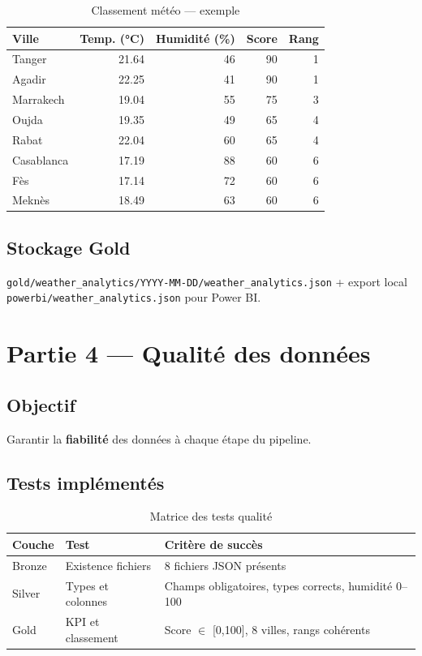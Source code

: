 \documentclass[12pt,a4paper]{report}
\begin{document}
\begin{table}[H]
\centering
\caption{Classement météo — exemple}
\begin{tabular}{@{}lrrrr@{}}
\toprule
\textbf{Ville} & \textbf{Temp. (°C)} & \textbf{Humidité (\%)} & \textbf{Score} & \textbf{Rang} \\
\midrule
Tanger    & 21.64 & 46 & 90 & 1 \\
Agadir    & 22.25 & 41 & 90 & 1 \\
Marrakech & 19.04 & 55 & 75 & 3 \\
Oujda     & 19.35 & 49 & 65 & 4 \\
Rabat     & 22.04 & 60 & 65 & 4 \\
Casablanca& 17.19 & 88 & 60 & 6 \\
Fès       & 17.14 & 72 & 60 & 6 \\
Meknès    & 18.49 & 63 & 60 & 6 \\
\bottomrule
\end{tabular}
\end{table}

\section{Stockage Gold}

\texttt{gold/weather\_analytics/YYYY-MM-DD/weather\_analytics.json} + export local \texttt{powerbi/weather\_analytics.json} pour Power BI.

\chapter{Partie 4 — Qualité des données}

\section{Objectif}

Garantir la \textbf{fiabilité} des données à chaque étape du pipeline.

\section{Tests implémentés}

\begin{table}[H]
\centering
\caption{Matrice des tests qualité}
\begin{tabular}{@{}p{2cm}p{5cm}p{6cm}@{}}
\toprule
\textbf{Couche} & \textbf{Test} & \textbf{Critère de succès} \\
\midrule
Bronze & Existence fichiers & 8 fichiers JSON présents \\
Silver & Types et colonnes  & Champs obligatoires, types corrects, humidité 0--100 \\
Gold   & KPI et classement  & Score $\in$ [0,100], 8 villes, rangs cohérents \\
\bottomrule
\end{tabular}
\end{table}
\end{document}
